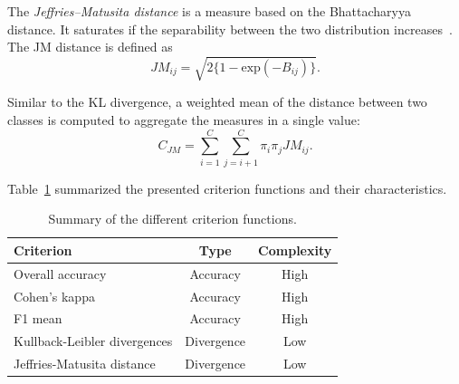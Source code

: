 \documentclass[journal]{IEEEtran}
\begin{document}
        The \emph{Jeffries–Matusita distance} is a measure based on the Bhattacharyya distance. It saturates if the separability between the two distribution increases~\cite{bruzzone2009novel}. The JM distance is defined as
        \begin{equation}\label{eq:jm}
            {JM}_{ij} = \sqrt{ 2 \{1 - \text{exp}(-B_{ij})\} }.
        \end{equation}

        Similar to the KL divergence,  a weighted mean of the distance
        between two classes is computed to aggregate the measures in a
        single value:
        \begin{equation}
            {C}_{JM} = \sum_{i=1}^{C} \sum_{j=i + 1}^{C} \pi_i \pi_j {JM}_{ij}.
        \end{equation}

        \vspace{10 mm}


        Table~\ref{tab:crit} summarized the presented criterion functions and their characteristics.

        \begin{table}[!t]
            \centering
            \caption{Summary of the different criterion functions.\label{tab:crit}}
            \begin{tabular}[b]{lcc}
              \toprule
              Criterion & Type & Complexity \\
              \midrule
              Overall accuracy            & Accuracy   & High \\
              Cohen's kappa               & Accuracy   & High\\
              F1 mean                     & Accuracy   & High\\
              \midrule
              Kullback-Leibler divergences & Divergence & Low \\
              Jeffries-Matusita distance  & Divergence & Low \\
              \bottomrule
            \end{tabular}
        \end{table}
\end{document}
